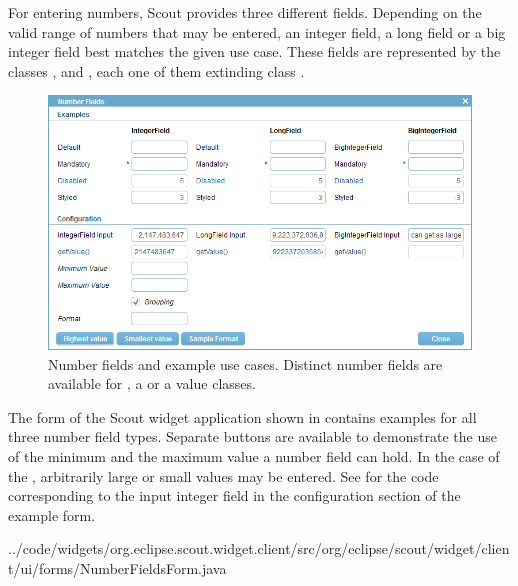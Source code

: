 \documentclass[a4paper,10pt,twoside]{book}
\begin{document}
{For entering numbers, Scout provides three different fields.
Depending on the valid range of numbers that may be entered, an integer field, a long field or a big integer field best matches the given use case.
These fields are represented by the classes ,  and , each one of them extinding class .

\begin{figure}
\includegraphics[width=15cm]{numberfield.png}
\caption{Number fields and example use cases.
Distinct number fields are available for , a  or a  value classes.
}
\end{figure}

The form  of the Scout widget application shown in  contains examples for all three number field types.
Separate buttons are available to demonstrate the use of the minimum and the maximum value a number field can hold.
In the case of the , arbitrarily large or small values may be entered. 
See  for the code corresponding to the input integer field in the configuration section of the example form.


{../code/widgets/org.eclipse.scout.widget.client/src/org/eclipse/scout/widget/client/ui/forms/NumberFieldsForm.java}

}
\end{document}
